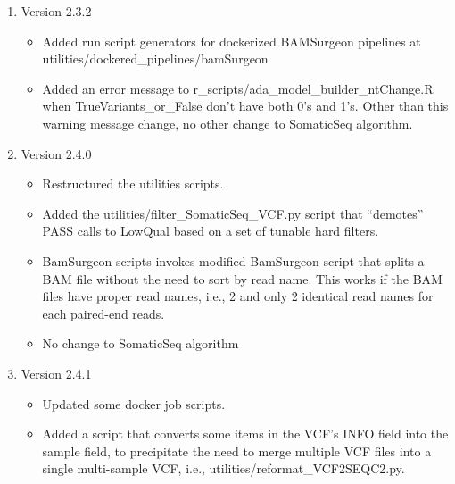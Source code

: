 \documentclass[10pt,letterpaper]{article}
\begin{document}
\begin{sloppypar}
\begin{enumerate}
	
	
	\item Version 2.3.2
	
		\begin{itemize}
		
		  \item
		  Added run script generators for dockerized BAMSurgeon pipelines at utilities/dockered\_pipelines/bamSurgeon
		  
		  \item
		  Added an error message to r\_scripts/ada\_model\_builder\_ntChange.R when TrueVariants\_or\_False don't have both 0's and 1's. Other than this warning message change, no other change to SomaticSeq algorithm.  
		
		\end{itemize}
	
	
	
	\item Version 2.4.0
	
		\begin{itemize}
		
		  \item
		  Restructured the utilities scripts.
		  
		  \item
		  Added the utilities/filter\_SomaticSeq\_VCF.py script that ``demotes'' PASS calls to LowQual based on a set of tunable hard filters.
		  
		  \item
		  BamSurgeon scripts invokes modified BamSurgeon script that splits a BAM file without the need to sort by read name. This works if the BAM files have proper read names, i.e., 2 and only 2 identical read names for each paired-end reads.
		  
		  \item
		  No change to SomaticSeq algorithm
		
		\end{itemize}
	
	
	
	\item Version 2.4.1
	
		\begin{itemize}
		
		  \item
		  Updated some docker job scripts.
		  
		  \item
		  Added a script that converts some items in the VCF's INFO field into the sample field, to precipitate the need to merge multiple VCF files into a single multi-sample VCF, i.e., utilities/reformat\_VCF2SEQC2.py.
		  

\end{itemize}
\end{enumerate}
\end{sloppypar}
\end{document}
